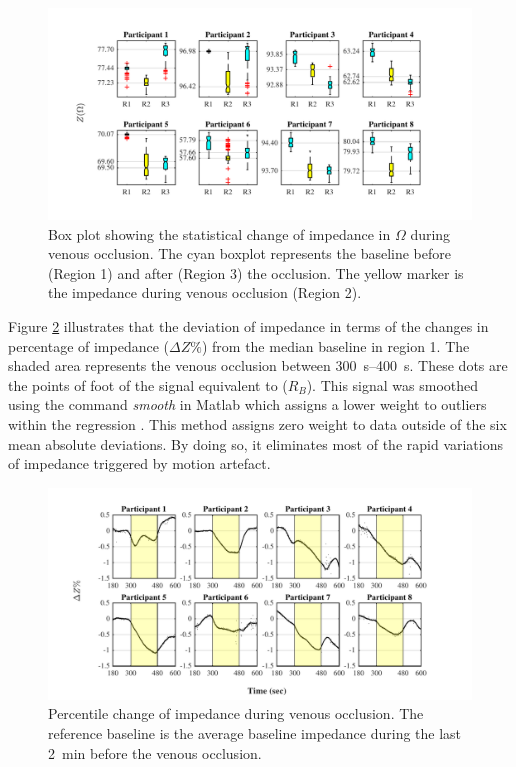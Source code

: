 \begin{figure}[htbp]
	\centering
	\includegraphics[width=15cm,keepaspectratio]{figure_vop_1}    
	\caption[Change of impedance during venous occlusion]{Box plot showing the statistical change of impedance in $\Omega$ during venous occlusion. The cyan boxplot represents the baseline before (Region 1) and after (Region 3) the occlusion. The yellow marker is the impedance during venous occlusion (Region 2).}
	\label{fig:venous statistics impedance}
\end{figure}  

Figure \ref{fig:venous occlusion impedance} illustrates that the deviation of impedance in terms of the changes in percentage of impedance ($\Delta Z\%$) from the median baseline in region 1. The shaded area represents the venous occlusion between \SIrange{300}{400}{\second}. These dots are the points of foot of the signal equivalent to ($R_B$). This signal was smoothed using the command \textit{smooth} in Matlab which assigns a lower weight to outliers within the regression \cite{MATLAB:2016}. This method assigns zero weight to data outside of the six mean absolute deviations. By doing so, it eliminates most of the rapid variations of impedance triggered by motion artefact. 

\begin{figure}[htbp]
	\centering
	\includegraphics[width=15cm,keepaspectratio]{figure_vop_2}    
	\caption[Percentile variation of impedance during venous occlusion]{Percentile change of impedance during venous occlusion. The reference baseline is the average baseline impedance during the last \SI{2}{\minute} before the venous occlusion.}
	\label{fig:venous occlusion impedance}
\end{figure} 

